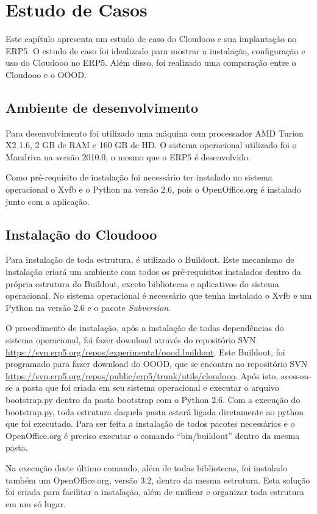 \chapter{Estudo de Casos}
\label{cap5}
Este capítulo apresenta um estudo de caso do Cloudooo e sua implantação no ERP5. O estudo de caso foi idealizado para mostrar a instalação, configuração e uso do Cloudooo no ERP5. Além disso, foi realizado uma comparação entre o Cloudooo e o OOOD.

\section{Ambiente de desenvolvimento}
Para desenvolvimento foi utilizado uma máquina com processador AMD Turion X2 1.6, 2 GB de RAM e 160 GB de HD. O sistema operacional utilizado foi o Mandriva na versão 2010.0, o mesmo que o ERP5 é desenvolvido.

Como pré-requisito de instalação foi necessário ter instalado no sistema operacional o Xvfb e o Python na versão 2.6, pois o OpenOffice.org é instalado junto com a aplicação.

\section{Instalação do Cloudooo}
Para instalação de toda estrutura, é utilizado o Buildout. Este mecanismo de instalação criará um ambiente com todos os pré-requisitos instalados dentro da própria estrutura do Buildout, exceto bibliotecas e aplicativos do sistema operacional. No sistema operacional é necessário que tenha instalado o Xvfb e um Python na versão 2.6 e o pacote \textit{Subversion}.

O procedimento de instalação, após a instalação de todas dependências do sistema operacional, foi fazer download através do repositório SVN \url{https://svn.erp5.org/repos/experimental/oood.buildout}. Este Buildout, foi programado para fazer download do OOOD, que se encontra no repositório SVN \url{https://svn.erp5.org/repos/public/erp5/trunk/utils/cloudooo}. Após isto, acessou-se a pasta que foi criada em seu sistema operacional e executar o arquivo bootstrap.py dentro da pasta bootstrap com o Python 2.6. Com a execução do bootstrap.py, toda estrutura daquela pasta estará ligada diretamente ao python que foi executado. Para ser feita a instalação de todos pacotes necessários e o OpenOffice.org é preciso executar o comando ``bin/buildout'' dentro da mesma pasta.

Na execução deste último comando, além de todas bibliotecas, foi instalado também um OpenOffice.org, versão 3.2, dentro da mesma estrutura. Esta solução foi criada para facilitar a instalação, além de unificar e organizar toda estrutura em um só lugar.

